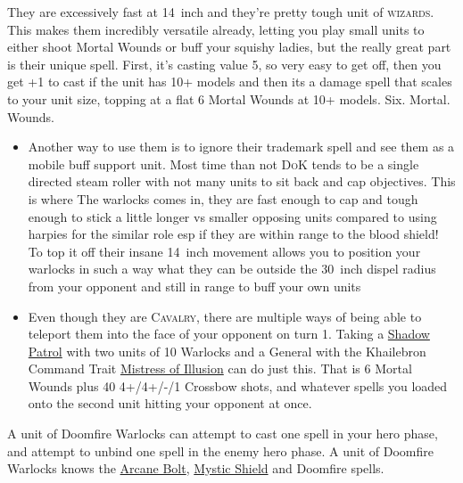 They are excessively fast at 14~inch and they're pretty tough unit of
\textsc{wizards}. This makes them incredibly versatile already, letting you
play small units to either shoot Mortal Wounds or buff your squishy ladies, but
the really great part is their unique spell. First, it's casting value 5, so
very easy to get off, then you get +1 to cast if the unit has 10+ models and
then its a damage spell that scales to your unit size, topping at a flat
6 Mortal Wounds at 10+ models. Six. Mortal. Wounds. 
\begin{itemize}
    \item Another way to use them is to ignore their trademark spell and see
        them as a mobile buff support unit. Most time than not \textsc{DoK}
        tends to be a single directed steam roller with not many units to sit
        back and cap objectives. This is where The warlocks comes in, they are
        fast enough to cap and tough enough to stick a little longer vs smaller
        opposing units compared to using harpies for the similar role esp if
        they are within range to the blood shield! To top it off their insane
        14~inch movement allows you to position your warlocks in such a way
        what they can be outside the 30~inch dispel radius from your opponent
        and still in range to buff your own units 
    \item Even though they are \textsc{Cavalry}, there are multiple ways of
        being able to teleport them into the face of your opponent on turn 1.
        Taking a \hyperref[shadowpaths]{Shadow Patrol} with two units of 10
        Warlocks and a General with the Khailebron Command Trait
        \hyperref[mistress-of-illusion]{Mistress of Illusion} can do just this.
        That is 6 Mortal Wounds plus 40 4+/4+/-/1 Crossbow shots, and whatever
        spells you loaded onto the second unit hitting your opponent at once.
\end{itemize}
A unit of Doomfire Warlocks can attempt to cast one spell in your hero phase,
and attempt to unbind one spell in the enemy hero phase. A unit of Doomfire
Warlocks knows the \hyperref[arcane-bolt]{Arcane Bolt},
\hyperref[mystic-shield]{Mystic Shield} and Doomfire spells.


\newpage %

